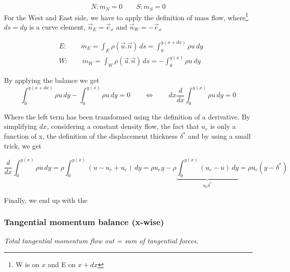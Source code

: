 \begin{equation}
	N : \dot{m}_N=0 \qquad S : \dot{m}_S=0
\end{equation}
For the West and East side, we have to apply the definition of mass flow, where\footnote{W is on $x$ and E on $x+dx$} $ds = dy$ is a curve element, $\vec{n}_E=\vec{e}_x$ and $\vec{n}_W=-\vec{e}_x$

\begin{equation}
\begin{aligned}
&E: 	\qquad\dot{m}_E= \int_{E} \rho (\vec{u}.\vec{n})\,  d s  
		= \int_{0}^{y(x+dx)} \rho u \, d y \\ 
&W: \qquad\dot{m}_W= \int_{W} \rho (\vec{u}.\vec{n})\, d s  
		 = -\int_{0}^{y(x)} \rho u \,d y  
		\end{aligned}
\end{equation}

By applying the balance we get
\begin{equation}
\int_{0}^{y(x+dx)} \rho u \, d y - \int_{0}^{y(x)} \rho u \, d y =0\qquad \Leftrightarrow \qquad dx \frac{d}{dx} \int_{0}^{y(x)} \rho u \, d y =0 
\end{equation}

Where the left term has been transformed using the definition of a derivative.
By simplifying $dx$, considering a constant density flow, the fact that $u_{e}$ is only a function of x, the definition of the displacement thickness $\delta^*$ and by using a small trick, we get

\begin{equation}
\frac{d}{dx} \int_{0}^{y(x)} \rho u \, dy = \rho \int_{0}^{y(x)}  (u-u_e+u_e) \, dy = \rho u_e y  -\rho \underbrace{\int_{0}^{y(x)}  (u_e-u) \, dy}_{u_e\delta ^*} = \rho u_e(y-\delta^*)
\end{equation}

Finally, we end up with the

\begin{center}
\end{center}

\subsubsection{Tangential momentum balance (x-wise)}

\textit{Total tangential momentum flow out = sum of tangential forces.}
\\

